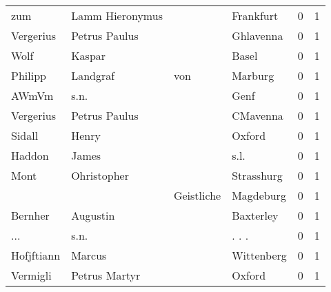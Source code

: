 \begin{center}
\begin{tiny}
\begin{longtabu}{llllrr}
                      zum &                    Lamm Hieronymus &             &                                   Frankfurt &          0 &         1 \\
                Vergerius &                      Petrus Paulus &             &                                   Ghlavenna &          0 &         1 \\
                     Wolf &                             Kaspar &             &                                       Basel &          0 &         1 \\
                  Philipp &                           Landgraf &         von &                                     Marburg &          0 &         1 \\
                    AWmVm &                               s.n. &             &                                        Genf &          0 &         1 \\
                Vergerius &                      Petrus Paulus &             &                                    CMavenna &          0 &         1 \\
                   Sidall &                              Henry &             &                                      Oxford &          0 &         1 \\
                   Haddon &                              James &             &                                        s.l. &          0 &         1 \\
                     Mont &                        Ohristopher &             &                                  Strasshurg &          0 &         1 \\
                          &                                    &  Geistliche &                                   Magdeburg &          0 &         1 \\
                  Bernher &                           Augustin &             &                                   Baxterley &          0 &         1 \\
                      ... &                               s.n. &             &                                      . . .  &          0 &         1 \\
               Hofjftiann &                             Marcus &             &                                  Wittenberg &          0 &         1 \\
                 Vermigli &                      Petrus Martyr &             &                                      Oxford &          0 &         1 \\

\end{longtabu}
\end{tiny}
\end{center}
